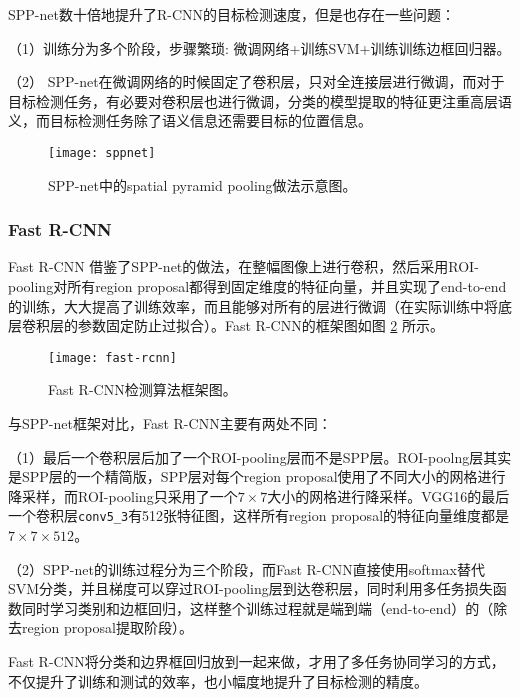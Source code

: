 SPP-net数十倍地提升了R-CNN的目标检测速度，但是也存在一些问题：
\begin{namelist}{}
	\item （1）训练分为多个阶段，步骤繁琐: 微调网络+训练SVM+训练训练边框回归器。
	\item （2） SPP-net在微调网络的时候固定了卷积层，只对全连接层进行微调，而对于目标检测任务，有必要对卷积层也进行微调，分类的模型提取的特征更注重高层语义，而目标检测任务除了语义信息还需要目标的位置信息。
\end{namelist}

\begin{figure}[!t]
	\centering
	\texttt{[image: sppnet]}
	\caption{SPP-net中的spatial pyramid pooling做法示意图。}
	\label{fig:sppnet}
\end{figure}

\subsubsection{Fast R-CNN}
Fast R-CNN \cite{fast-rcnn} 借鉴了SPP-net的做法，在整幅图像上进行卷积，然后采用ROI-pooling对所有region proposal都得到固定维度的特征向量，并且实现了end-to-end的训练，大大提高了训练效率，而且能够对所有的层进行微调（在实际训练中将底层卷积层的参数固定防止过拟合）。Fast R-CNN的框架图如图 \ref{fig:fast-rcnn} 所示。
\begin{figure}[t]
	\centering
	\texttt{[image: fast-rcnn]}
	\caption{Fast R-CNN检测算法框架图。}
	\label{fig:fast-rcnn}
\end{figure}

与SPP-net框架对比，Fast R-CNN主要有两处不同：
\begin{namelist}{}
	\item （1）最后一个卷积层后加了一个ROI-pooling层而不是SPP层。ROI-poolng层其实是SPP层的一个精简版，SPP层对每个region proposal使用了不同大小的网格进行降采样，而ROI-pooling只采用了一个$7\times7$大小的网格进行降采样。VGG16的最后一个卷积层\texttt{conv5\_3}有512张特征图，这样所有region proposal的特征向量维度都是$7\times7\times512$。 
	\item （2）SPP-net的训练过程分为三个阶段，而Fast R-CNN直接使用softmax替代SVM分类，并且梯度可以穿过ROI-pooling层到达卷积层，同时利用多任务损失函数同时学习类别和边框回归，这样整个训练过程就是端到端（end-to-end）的（除去region proposal提取阶段）。
\end{namelist}
Fast R-CNN将分类和边界框回归放到一起来做，才用了多任务协同学习的方式，不仅提升了训练和测试的效率，也小幅度地提升了目标检测的精度。

